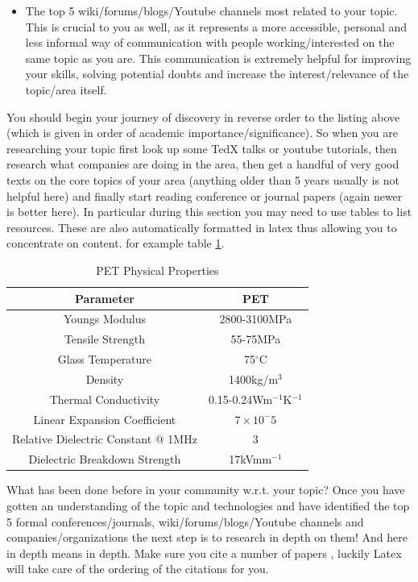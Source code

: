 \begin{itemize}
    \item The top 5 wiki/forums/blogs/Youtube channels most related to your topic. This is crucial to you as well, as it represents a more accessible, personal and less informal way of communication with people working/interested on the same topic as you are. This communication is extremely helpful for improving your skills, solving potential doubts and increase the interest/relevance of the topic/area itself.
\end{itemize}

You should begin your journey of discovery in reverse order to the listing above (which is given in order of academic importance/significance). So when you are researching your topic first look up some TedX talks or youtube tutorials, then research what companies are doing in the area, then get a handful of very good texts on the core topics of your area (anything older than 5 years usually is not helpful here) and finally start reading conference or journal papers (again newer is better here). In particular during this section you may need to use tables to list resources. These are also automatically formatted in latex thus allowing you to concentrate on content. for example table \ref{tab:Mylar}.

\begin{table}[ht]
	\centering
		\begin{tabular}{ c  c  }
		\hline
		\hline
		Parameter & PET \\
		\hline
		Youngs Modulus & 2800-3100MPa \\
		Tensile Strength & 55-75MPa \\
		Glass Temperature & 75$^\circ$C \\
		Density & 1400kg/m$^3$ \\
		Thermal Conductivity & 0.15-0.24Wm$^{-1}$K$^{-1}$ \\
		Linear Expansion Coefficient & $7\times10^-5$ \\
		Relative Dielectric Constant @ 1MHz & 3\\
		Dielectric Breakdown Strength & 17kVmm$^{-1}$\\
		\end{tabular}
	\caption{PET Physical Properties}
	\label{tab:Mylar}
\end{table}

What has been done before in your community w.r.t. your topic? Once you have gotten an understanding of the topic and technologies and have identified the top 5 formal conferences/journals, wiki/forums/blogs/Youtube channels and companies/organizations the next step is to research in depth on them! And here in depth means in depth. Make sure you cite\cite{Reference1} a number of papers \cite{Reference3}, luckily Latex will take care of the ordering of the citations \cite{Reference2} for you.

